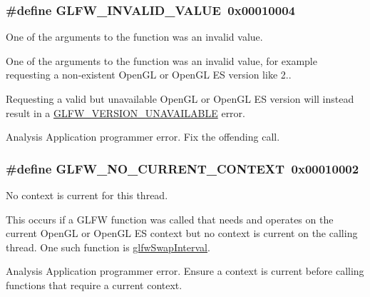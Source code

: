 \subsubsection[{G\+L\+F\+W\+\_\+\+I\+N\+V\+A\+L\+I\+D\+\_\+\+V\+A\+L\+U\+E}]{\setlength{\rightskip}{0pt plus 5cm}\#define G\+L\+F\+W\+\_\+\+I\+N\+V\+A\+L\+I\+D\+\_\+\+V\+A\+L\+U\+E~0x00010004}\label{group__errors_gaaf2ef9aa8202c2b82ac2d921e554c687}


One of the arguments to the function was an invalid value. 

One of the arguments to the function was an invalid value, for example requesting a non-\/existent Open\+G\+L or Open\+G\+L E\+S version like 2..

Requesting a valid but unavailable Open\+G\+L or Open\+G\+L E\+S version will instead result in a \hyperlink{group__errors_gad16c5565b4a69f9c2a9ac2c0dbc89462}{G\+L\+F\+W\+\_\+\+V\+E\+R\+S\+I\+O\+N\+\_\+\+U\+N\+A\+V\+A\+I\+L\+A\+B\+L\+E} error.

\begin{DoxyParagraph}{Analysis}
Application programmer error. Fix the offending call. 
\end{DoxyParagraph}
\hypertarget{group__errors_gaa8290386e9528ccb9e42a3a4e16fc0d0}{}
\subsubsection[{G\+L\+F\+W\+\_\+\+N\+O\+\_\+\+C\+U\+R\+R\+E\+N\+T\+\_\+\+C\+O\+N\+T\+E\+X\+T}]{\setlength{\rightskip}{0pt plus 5cm}\#define G\+L\+F\+W\+\_\+\+N\+O\+\_\+\+C\+U\+R\+R\+E\+N\+T\+\_\+\+C\+O\+N\+T\+E\+X\+T~0x00010002}\label{group__errors_gaa8290386e9528ccb9e42a3a4e16fc0d0}


No context is current for this thread. 

This occurs if a G\+L\+F\+W function was called that needs and operates on the current Open\+G\+L or Open\+G\+L E\+S context but no context is current on the calling thread. One such function is \hyperlink{group__context_ga12a595c06947cec4967c6e1f14210a8a}{glfw\+Swap\+Interval}.

\begin{DoxyParagraph}{Analysis}
Application programmer error. Ensure a context is current before calling functions that require a current context. 
\end{DoxyParagraph}
\hypertarget{group__errors_ga2374ee02c177f12e1fa76ff3ed15e14a}{}
